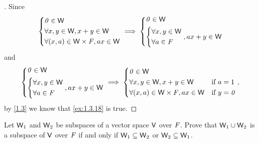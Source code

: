 \begin{proof}[]
  Since
  \[
    \begin{dcases}
      \mathit{0} \in \mathsf{W}                        \\
      \forall x, y \in \mathsf{W}, x + y \in \mathsf{W} \\
      \forall (x, a) \in \mathsf{W} \times \mathit{F}, ax \in \mathsf{W}
    \end{dcases} \implies \begin{dcases}
      \mathit{0} \in \mathsf{W} \\
      \begin{dcases}
        \forall x, y \in \mathsf{W} \\
        \forall a \in \mathit{F}
      \end{dcases}, ax + y \in \mathsf{W}
    \end{dcases}
  \]
  and
  \[
    \begin{dcases}
      \mathit{0} \in \mathsf{W} \\
      \begin{dcases}
        \forall x, y \in \mathsf{W} \\
        \forall a \in \mathit{F}
      \end{dcases}, ax + y \in \mathsf{W}
    \end{dcases} \implies \begin{dcases}
      \mathit{0} \in \mathsf{W}                                                      \\
      \forall x, y \in \mathsf{W}, x + y \in \mathsf{W}          & \text{if } a = 1   \\
      \forall (x, a) \in \mathsf{W} \times \mathit{F}, ax \in \mathsf{W} & \text{if } y = \mathit{0}
    \end{dcases},
  \]
  by \cref{1.3} we know that \cref{ex:1.3.18} is true.
\end{proof}

\begin{ex}\label{ex:1.3.19}
  Let \(\mathsf{W}_1\) and \(\mathsf{W}_2\) be subspaces of a vector space \(\mathsf{V}\) over \(\mathit{F}\).
  Prove that \(\mathsf{W}_1 \cup \mathsf{W}_2\) is a subspace of \(\mathsf{V}\) over \(\mathit{F}\) if and only if \(\mathsf{W}_1 \subseteq \mathsf{W}_2\) or \(\mathsf{W}_2 \subseteq \mathsf{W}_1\).
\end{ex}

